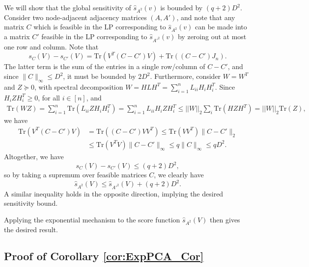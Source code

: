 \documentclass{article}
\newcommand{\Tr}{\ensuremath{\mathrm{Tr}}}
\begin{document}
We will show that the global sensitivity of $\widehat{s}_{A^2}(v)$ is bounded by $(q+2)D^2$. Consider two node-adjacent adjacency matrices $(A,A')$, and note that any matrix $C$ which is feasible in the LP corresponding to $\widehat{s}_{A^2}(v)$ can be made into a matrix $C'$ feasible in the LP corresponding to $\widehat{s}_{A'^2}(v)$ by zeroing out at most one row and column. Note that
\begin{equation*}
s_C(V) - s_{C'}(V) = \Tr(V^T(C-C')V) + \Tr((C-C')J_n).
\end{equation*}
The latter term is the sum of the entries in a single row/column of $C-C'$, and since $\|C\|_\infty \le D^2$, it must be bounded by $2D^2$. Furthermore, consider $W=W^T$ and $Z \succeq 0$, with spectral decomposition $W = HLH^T = \mathop{\sum}\limits_{i = 1}^n L_{ii}H_iH_i^T$. Since $H_iZH_i^T \geq 0$, for all $i \in [n]$, and 
\begin{align*}
\Tr(WZ) = \sum_{i = 1}^n \Tr(L_{ii}ZH_iH_i^T) = \sum_{i = 1}^n L_{ii}H_iZH_i^T \leq ||W||_2 \sum_{i}\Tr(HZH^T) = ||W||_2\Tr(Z), 
\end{align*}
we have
\begin{align*}
\Tr(V^T(C-C')V) & = \Tr((C-C')VV^T) \le \Tr(VV^T) \|C-C'\|_2 \\
%
& \le \Tr(V^TV) \|C-C'\|_\infty \le q \|C\|_\infty \le qD^2.
\end{align*}
Altogether, we have
\begin{equation*}
s_C(V) - s_{C'}(V) \le (q+2)D^2,
\end{equation*}
so by taking a supremum over feasible matrices $C$, we clearly have
\begin{equation*}
\widehat{s}_{A^2}(V) \le \widehat{s}_{A'^2}(V) + (q+2)D^2.
\end{equation*}
A similar inequality holds in the opposite direction, implying the desired sensitivity bound.

Applying the exponential mechanism to the score function $\widehat{s}_{A^2}(V)$ then gives the desired result.

\subsection{Proof of Corollary \ref{cor:ExpPCA_Cor}}
\label{AppExpPCA_Cor}
\end{document}
